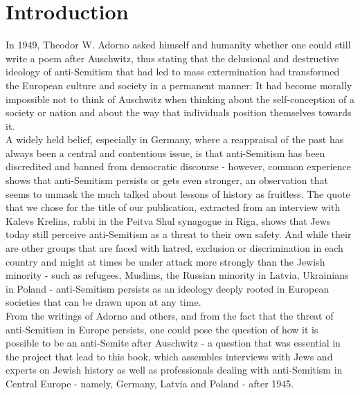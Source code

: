 \section{Introduction}
\vspace*{3em}
In 1949, Theodor W. Adorno asked himself and humanity whether one could still write a poem after Auschwitz, thus stating that the delusional and destructive ideology of anti-Semitism that had led to mass extermination had transformed the European culture and society in a permanent manner: It had become morally impossible not to think of Auschwitz when thinking about the self-conception of a society or nation and about the way that individuals position themselves towards it.\\
A widely held belief, especially in Germany, where a reappraisal of the past has always been a central and contentious issue, is that anti-Semitism has been discredited and banned from democratic discourse - however, common experience shows that anti-Semitism persists or gets even stronger, an observation that seems to unmask the much talked about lessons of history as fruitless. The quote that we chose for the title of our publication, extracted from an interview with Kalevs Krelins, rabbi in the Peitva Shul synagogue in Riga, shows that Jews today still perceive anti-Semitism as a threat to their own safety. And while their are other groups that are faced with hatred, exclusion or discrimination in each country and might at times be under attack more strongly than the Jewish minority - such as refugees, Muslims, the Russian minority in Latvia, Ukrainians in Poland - anti-Semitism persists as an ideology deeply rooted in European societies that can be drawn upon at any time.\\
From the writings of Adorno and others, and from the fact that the threat of anti-Semitism in Europe persists, one could pose the question of how it is possible to be an anti-Semite after Auschwitz - a question that was essential in the project that lead to this book, which assembles interviews with Jews and experts on Jewish history as well as professionals dealing with anti-Semitism in Central Europe - namely, Germany, Latvia and Poland - after 1945.
